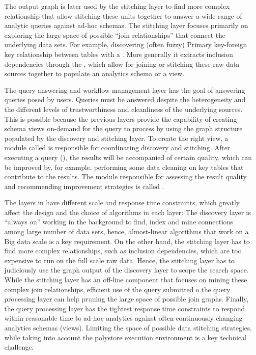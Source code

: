 The output graph is later used by the stitching layer to find more complex
relationship that allow stitching these units together to answer a wide range of
analytic queries against ad-hoc schemas. The stitching layer focuses primarily on
exploring the large space of possible ``join relationships'' that connect the
underlying data sets. For example, discovering (often fuzzy) Primary key-foreign
key relationship between tables with a . More
generally it extracts inclusion dependencies through the ,
which allow for joining or stitching these raw data sources together to populate
an analytics schema or a view. 

The query answering and workflow management layer has the goal of answering queries posed by users. Queries must be answered despite the heterogeneity and the different levels of
trustworthiness and cleanliness of the underlying sources. This is possible
because the previous layers provide the capability of creating schema views
on-demand for the query to process by using the graph structure populated by
the discovery and stitching layer. To create the right view, a module
called  is responsible for coordinating discovery
and stitching. After executing a query (), the results will
be accompanied of certain quality, which can be improved by, for example,
performing some data cleaning on key tables that contribute to the results. The
module responsible for assessing the result quality and recommending improvement
strategies is called .

The  layers in \dcv have different scale and response time constraints,
which greatly affect the design and the choice of algorithms in each layer: The
discovery layer is ``always on'' working in the background to find, index and
mine connections among large number of data sets, hence, almost-linear
algorithms that work on a Big data scale is a key requirement. 
On the other hand, the stitching layer has to find more complex
relationships, such as inclusion dependencies, which are too expensive to run on
the full scale raw data. Hence, the stitching layer has to judiciously use the
graph output of the discovery layer to scope the search space. While the stitching
layer has an off-line component that focuses on mining these complex join
relationships, efficient use of the query submitted o the query processing layer
can help pruning the large space of possible join graphs. Finally, the query processing layer has the tightest response time constraints to respond
within reasonable time to ad-hoc analytics against often continuously changing
analytics schemas (views). Limiting the space of possible data stitching
strategies, while taking into account the polystore execution environment is a
key technical challenge. 

